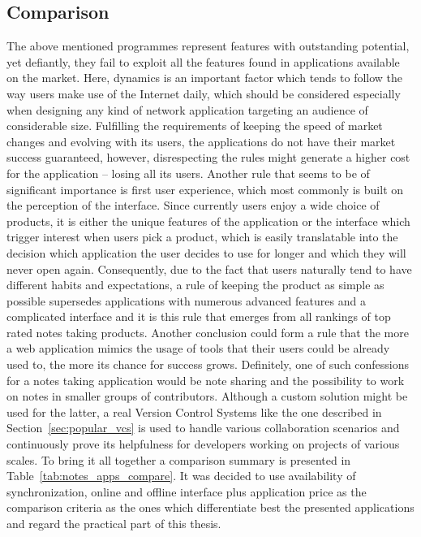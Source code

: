 \subsection{Comparison}\label{subsec:vcs_comparison}
The above mentioned programmes represent features with outstanding potential, yet defiantly, they fail to exploit all the features found in applications available on the market. Here, dynamics is an important factor which tends to follow the way users make use of the Internet daily, which should be considered especially when designing any kind of network application targeting an audience of considerable size. Fulfilling the requirements of keeping the speed of market changes and evolving with its users, the applications do not have their market success guaranteed, however, disrespecting the rules might generate a higher cost for the application -- losing all its users. Another rule that seems to be of significant importance is first user experience, which most commonly is built on the perception of the interface. Since currently users enjoy a wide choice of products, it is either the unique features of the application or the interface which trigger interest when users pick a product, which is easily translatable into the decision which application the user decides to use for longer and which they will never open again. Consequently, due to the fact that users naturally tend to have different habits and expectations, a rule of keeping the product as simple as possible supersedes applications with numerous advanced features and a complicated interface and it is this rule that emerges from all rankings of top rated notes taking products. Another conclusion could form a rule that the more a web application mimics the usage of tools that their users could be already used to, the more its chance for success grows. Definitely, one of such confessions for a notes taking application would be note sharing and the possibility to work on notes in smaller groups of contributors. Although a custom solution might be used for the latter, a real Version Control Systems like the one described in Section~\ref{sec:popular_vcs} is used to handle various collaboration scenarios and continuously prove its helpfulness for developers working on projects of various scales. To bring it all together a comparison summary is presented in Table~\ref{tab:notes_apps_compare}.  It was decided to use availability of synchronization, online and offline interface plus application price as the comparison criteria as the ones which differentiate best the presented applications and regard the practical part of this thesis.   
